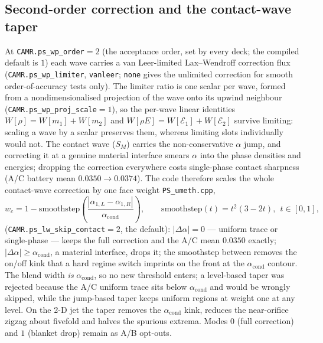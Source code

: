 \documentclass[11pt,a4paper]{article}
\newcommand{\code}[1]{\texttt{\small #1}}
\newcommand{\src}[1]{{\color{gray}\code{#1}}}
\begin{document}
\subsection{Second-order correction and the contact-wave taper}
\label{sec:limiter}

At \code{CAMR.ps\_wp\_order}$=2$ (the acceptance order, set by every
deck; the compiled default is $1$) each wave carries a van Leer-limited
Lax--Wendroff correction flux (\code{CAMR.ps\_wp\_limiter}, \code{vanleer};
\code{none} gives the unlimited correction for smooth order-of-accuracy
tests only).  The limiter ratio is one scalar per wave, formed from a
nondimensionalised projection of the wave onto its upwind neighbour
(\code{CAMR.ps\_wp\_proj\_scale}$=1$), so the per-wave linear identities
$W[\rho]=W[m_1]+W[m_2]$ and $W[\rho E]=W[\mathcal{E}_1]+W[\mathcal{E}_2]$
survive limiting: scaling a wave by a scalar preserves them, whereas limiting
slots individually would not.  The contact wave ($S_M$) carries the
non-conservative $\alpha$ jump, and correcting it at a genuine material
interface smears $\alpha$ into the phase densities and energies; dropping the
correction everywhere costs single-phase contact sharpness (A/C battery mean
$0.0350\to0.0374$).  The code therefore scales the whole contact-wave
correction by one face weight \src{PS\_umeth.cpp},
\begin{equation}
  w_c = 1 - \mathrm{smoothstep}\!\left(
        \frac{|\alpha_{1,L}-\alpha_{1,R}|}{\alpha_{\mathrm{cond}}}\right),
  \qquad
  \mathrm{smoothstep}(t)=t^2(3-2t),\ \ t\in[0,1],
  \label{eq:wckeep}
\end{equation}
(\code{CAMR.ps\_lw\_skip\_contact}$=2$, the default): $|\Delta\alpha|=0$ ---
uniform trace or single-phase --- keeps the full correction and the A/C mean
$0.0350$ exactly; $|\Delta\alpha|\ge\alpha_{\mathrm{cond}}$, a material
interface, drops it; the smoothstep between removes the on/off kink that a
hard regime switch imprints on the front at the $\alpha_{\mathrm{cond}}$
contour.  The blend width \emph{is} $\alpha_{\mathrm{cond}}$, so no new
threshold enters; a level-based taper was rejected because the A/C uniform
trace sits below $\alpha_{\mathrm{cond}}$ and would be wrongly skipped, while
the jump-based taper keeps uniform regions at weight one at any level.  On
the 2-D jet the taper removes the $\alpha_{\mathrm{cond}}$ kink, reduces the
near-orifice zigzag about fivefold and halves the spurious extrema.  Modes
$0$ (full correction) and $1$ (blanket drop) remain as A/B opt-outs.

\end{document}
